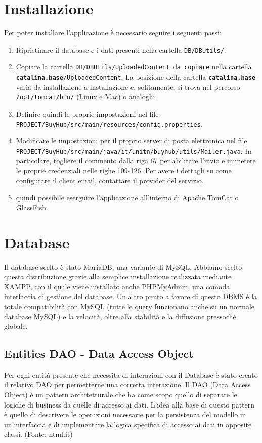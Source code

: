 \chapter{Installazione}
Per poter installare l'applicazione è necessario seguire i seguenti passi:
\begin{enumerate}

\item Ripristinare il database e i dati presenti nella cartella \texttt{DB/DBUtils/}.
\item Copiare la cartella \texttt{DB/DBUtils/UploadedContent da copiare} nella cartella \\\texttt{\textbf{catalina.base}/UploadedContent}.
La posizione della cartella \texttt{\textbf{catalina.base}} varia da installazione a installazione e, solitamente, si trova nel percorso \texttt{/opt/tomcat/bin/} (Linux e Mac) o analoghi.
\item Definire quindi le proprie impostazioni nel file \\\texttt{PROJECT/BuyHub/src/main/resources/config.properties}.
\item Modificare le impostazioni per il proprio server di posta elettronica nel file\\ \texttt{PROJECT/BuyHub/src/main/java/it/unitn/buyhub/utils/Mailer.java}. In particolare, togliere il commento dalla riga 67 per abilitare l'invio e immetere le proprie credenziali nelle righe 109-126. Per avere i dettagli su come configurare il client email, contattare il provider del servizio.
\item \E quindi possibile eserguire l'applicazione all'interno di Apache TomCat o GlassFish.
\end{enumerate}

\chapter{Database}

Il database scelto è stato MariaDB, una variante di MySQL. Abbiamo scelto questa distribuzione grazie alla semplice installazione realizzata mediante XAMPP, con il quale viene installato anche PHPMyAdmin, una comoda interfaccia di gestione del database. Un altro punto a favore di questo DBMS è la totale compatibilità con MySQL (tutte le query funzionano anche su un normale database MySQL) e la velocità, oltre alla stabilità e la diffusione pressochè globale.

\section{Entities DAO - Data Access Object}
Per ogni entità presente che necessita di interazioni con il Database è stato creato il relativo DAO per permetterne una corretta interazione. Il DAO (Data Access Object) è un pattern architetturale che ha come scopo quello di separare le logiche di business da quelle di accesso ai dati. L’idea alla base di questo pattern è quello di descrivere le operazioni necessarie per la persistenza del modello in un’interfaccia e di implementare la logica specifica di accesso ai dati in apposite classi. (Fonte: html.it)

